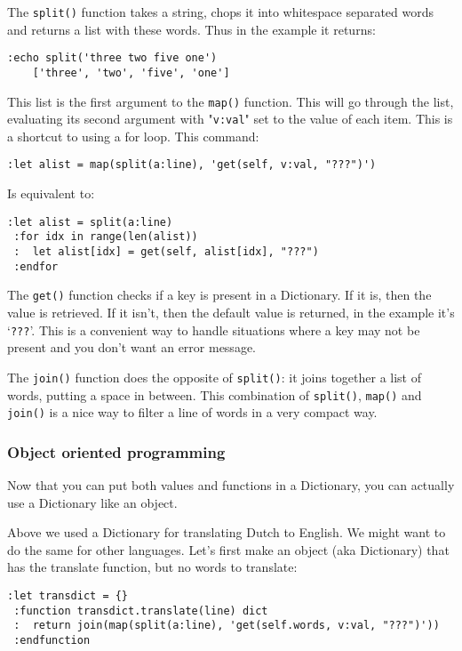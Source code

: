 The \texttt{split()} function takes a string, chops it into whitespace separated words and returns a list with these words.
Thus in the example it returns:

\begin{Verbatim}[samepage=true]
 :echo split('three two five one')
    ['three', 'two', 'five', 'one']
\end{Verbatim}

This list is the first argument to the \texttt{map()} function.
This will go through the list, evaluating its second argument with "\texttt{v:val}" set to the value of each item.
This is a shortcut to using a for loop.
This command:

\begin{Verbatim}[samepage=true]
 :let alist = map(split(a:line), 'get(self, v:val, "???")')
\end{Verbatim}

Is equivalent to:

\begin{Verbatim}[samepage=true]
 :let alist = split(a:line)
 :for idx in range(len(alist))
 :  let alist[idx] = get(self, alist[idx], "???")
 :endfor
\end{Verbatim}

The \texttt{get()} function checks if a key is present in a Dictionary.
If it is, then the value is retrieved.
If it isn't, then the default value is returned, in the example it's `\texttt{???}'.
This is a convenient way to handle situations where a key may not be present and you don't want an error message.

The \texttt{join()} function does the opposite of \texttt{split()}: it joins together a list of words, putting a space in between.
This combination of \texttt{split()}, \texttt{map()} and \texttt{join()} is a nice way to filter a line of words in a very compact way.

\subsubsection{Object oriented programming}
Now that you can put both values and functions in a Dictionary, you can actually use a Dictionary like an object.

Above we used a Dictionary for translating Dutch to English.
We might want to do the same for other languages.
Let's first make an object (aka Dictionary) that has the translate function, but no words to translate:

\begin{Verbatim}[samepage=true]
 :let transdict = {}
 :function transdict.translate(line) dict
 :  return join(map(split(a:line), 'get(self.words, v:val, "???")'))
 :endfunction
\end{Verbatim}

